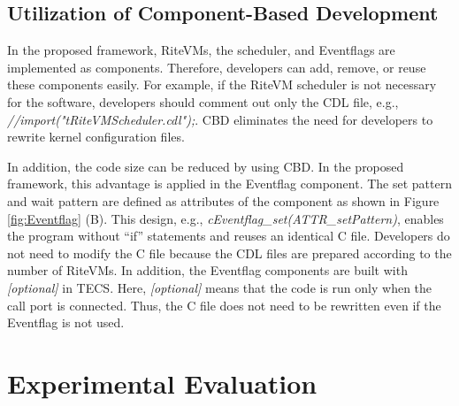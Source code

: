 \documentclass[conference]{IEEEtran/IEEEtran/IEEEtran}
\begin{document}
 
\subsection{Utilization of Component-Based Development}
In the proposed framework, RiteVMs, the scheduler, and Eventflags are implemented as components.
Therefore, developers can add, remove, or reuse these components easily.
For example, if the RiteVM scheduler is not necessary for the software, developers should comment out only the CDL file, e.g., {\it //import("tRiteVMScheduler.cdl");}.
CBD eliminates the need for developers to rewrite kernel configuration files.

In addition, the code size can be reduced by using CBD. 
In the proposed framework, this advantage is applied in the Eventflag component.
The set pattern and wait pattern are defined as attributes of the component as shown in Figure \ref{fig:Eventflag} (B).
This design, e.g., {\it cEventflag\_set(ATTR\_setPattern)}, enables the program without ``if'' statements and reuses an identical C file.
Developers do not need to modify the C file because the CDL files are prepared according to the number of RiteVMs.
In addition, the Eventflag components are built with {\it [optional]} in TECS.
Here, {\it [optional]} means that the code is run only when the call port is connected.
Thus, the C file does not need to be rewritten even if the Eventflag is not used. 

\section{Experimental Evaluation}
\label{sec:Evaluation}
\end{document}
